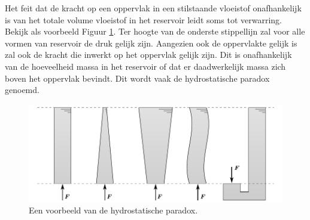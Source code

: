 Het feit dat de kracht op een oppervlak in een stilstaande vloeistof onafhankelijk is van het totale volume vloeistof in het reservoir leidt soms tot verwarring. Bekijk als voorbeeld Figuur \ref{fig:hydrostatische_paradox}. Ter hoogte van de onderste stippellijn zal voor alle vormen van reservoir de druk gelijk zijn. Aangezien ook de oppervlakte gelijk is zal ook de kracht die inwerkt op het oppervlak gelijk zijn. Dit is onafhankelijk van de hoeveelheid massa in het reservoir of dat er daadwerkelijk massa zich boven het oppervlak bevindt. Dit wordt vaak de hydrostatische paradox genoemd.
\begin{figure}[htb]
	\centering
	\includegraphics{fig/hydrostatica/hydrostatische_paradox}
	\caption{Een voorbeeld van de hydrostatische paradox.}
	\label{fig:hydrostatische_paradox}
\end{figure}

